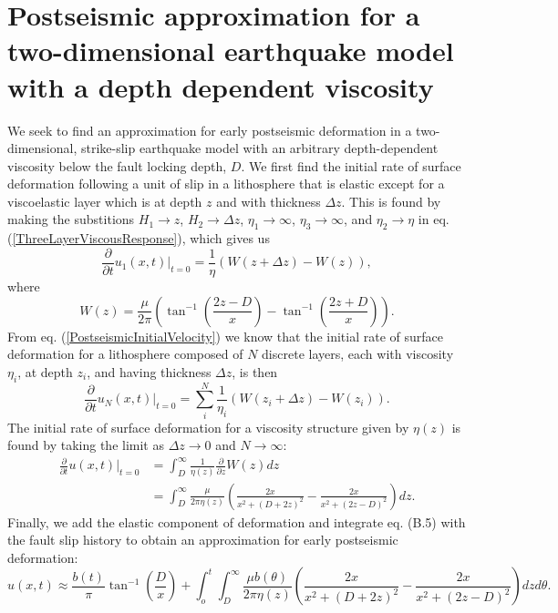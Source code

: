 \documentclass[extra,mreferee]{gji}
\begin{document}
\section{Postseismic approximation for a two-dimensional earthquake model with a depth dependent viscosity}
We seek to find an approximation for early postseismic deformation in
a two-dimensional, strike-slip earthquake model with an arbitrary
depth-dependent viscosity below the fault locking depth, $D$.  We
first find the initial rate of surface deformation following a unit of
slip in a lithosphere that is elastic except for a viscoelastic layer
which is at depth $z$ and with thickness $\Delta z$. This is found by
making the substitions $H_1 \to z$, $H_2 \to \Delta z$, $\eta_1 \to
\infty$, $\eta_3 \to \infty$, and $\eta_2 \to \eta$ in
eq. (\ref{ThreeLayerViscousResponse}), which gives us
\begin{equation}
  \frac{\partial}{\partial t}u_1(x,t)\big|_{t=0} = 
  \frac{1}{\eta}(W(z+\Delta z) - W(z)),
\end{equation}
where
\begin{equation}
  W(z) = \frac{\mu}{2\pi}\left(\tan^{-1}\left(\frac{2z-D}{x}\right) -
  \tan^{-1}\left(\frac{2z+D}{x}\right)\right).
\end{equation}
From eq. (\ref{PostseismicInitialVelocity}) we know that the initial
rate of surface deformation for a lithosphere composed of $N$ discrete
layers, each with viscosity $\eta_i$, at depth $z_i$, and having
thickness $\Delta z$, is then
\begin{equation}
  \frac{\partial}{\partial t}u_N(x,t)\big|_{t=0} = \sum_i^N
  \frac{1}{\eta_i}(W(z_i + \Delta z) - W(z_i)).
\end{equation}
The initial rate of surface deformation for a viscosity structure
given by $\eta(z)$ is found by taking the limit as $\Delta z \to 0$
and $N \to \infty$:
\begin{align}\label{ArbitraryViscousResponse}
 \frac{\partial}{\partial t}u(x,t)\big|_{t=0} &= \int_D^\infty
 \frac{1}{\eta(z)}\frac{\partial}{\partial z} W(z) dz\\
 &= \int_D^{\infty}\frac{\mu}{2\pi\eta(z)}\left(\frac{2x}{x^2 + \left(D + 2z\right)^2} -
                     \frac{2x}{x^2 + \left(2z - D\right)^2}\right) dz.
\end{align}
Finally, we add the elastic component of deformation and integrate
eq. (B.5) with the fault slip history to obtain
an approximation for early postseismic deformation:
\begin{equation}
u(x,t) \approx \frac{b(t)}{\pi}\tan^{-1}(\frac{D}{x}) + 
               \int_o^t\int_D^\infty \frac{\mu b(\theta)}{2\pi\eta(z)}
                                    \left(\frac{2x}{x^2 + \left(D + 2z\right)^2} - 
                                    \frac{2x}{x^2 + \left(2z - D\right)^2}\right)
                                    dz d\theta.
\end{equation}
\end{document}
